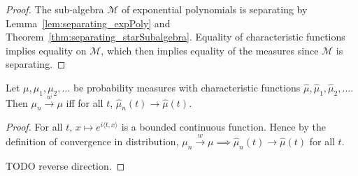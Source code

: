 \begin{proof}
The sub-algebra $\mathcal M$ of exponential polynomials is separating by Lemma~\ref{lem:separating_expPoly} and Theorem~\ref{thm:separating_starSubalgebra}. Equality of characteristic functions implies equality on $\mathcal M$, which then implies equality of the measures since $\mathcal M$ is separating.
\end{proof}

\begin{theorem}\label{thm:charFun_tendsto_iff_measure_tendsto}
Let $\mu, \mu_1, \mu_2, \ldots$ be probability measures with characteristic functions $\hat{\mu}, \hat{\mu}_1, \hat{\mu}_2, \ldots$. Then $\mu_n \xrightarrow{w} \mu$ iff for all $t$, $\hat{\mu}_n(t) \to \hat{\mu}(t)$.
\end{theorem}

\begin{proof}
For all $t$, $x \mapsto e^{i \langle t, x \rangle}$ is a bounded continuous function. Hence by the definition of convergence in distribution, $\mu_n \xrightarrow{w} \mu \implies \hat{\mu}_n(t) \to \hat{\mu}(t)$ for all $t$.

TODO reverse direction.
\end{proof}